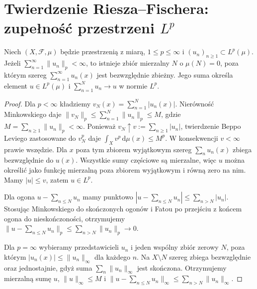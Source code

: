 \section{Twierdzenie Riesza--Fischera: zupełność przestrzeni $L^p$}

\begin{twierdzenie}
\label{thm:series-lp-14}
Niech $(X,\mathcal F,\mu)$ będzie przestrzenią z miarą,
$1\le p\le\infty$ i $(u_n)_{n\ge1}\subset L^p(\mu)$.
Jeżeli $\sum_{n=1}^\infty\|u_n\|_p<\infty$,
to istnieje zbiór mierzalny $N$ o $\mu(N)=0$,
poza którym szereg $\sum_{n=1}^\infty u_n(x)$
jest bezwzględnie zbieżny. Jego suma określa element $u\in L^p(\mu)$
i $\sum_{n=1}^N u_n\to u$ w normie $L^p$.
\end{twierdzenie}
\begin{proof}
Dla $p<\infty$ kładziemy $v_N(x)=\sum_{n=1}^N|u_n(x)|$.
Nierówność Minkowskiego daje
$\|v_N\|_p\le\sum_{n=1}^N\|u_n\|_p\le M$,
gdzie $M=\sum_{n\ge1}\|u_n\|_p<\infty$.
Ponieważ $v_N\uparrow v:=\sum_{n\ge1}|u_n|$,
twierdzenie Beppo Leviego zastosowane do $v_N^p$ daje
$\int_Xv^p\,\mathrm d\mu(x)\le M^p$.
W konsekwencji $v<\infty$ prawie wszędzie.
Dla $x$ poza tym zbiorem wyjątkowym szereg
$\sum_nu_n(x)$ zbiega bezwzględnie do $u(x)$.
Wszystkie sumy częściowe są mierzalne, więc $u$
można określić jako funkcję mierzalną poza zbiorem
wyjątkowym i równą zero na nim. Mamy $|u|\le v$,
zatem $u\in L^p$.

Dla ogona $u-\sum_{n\le N}u_n$ mamy punktowo
$|u-\sum_{n\le N}u_n|\le\sum_{n>N}|u_n|$.
Stosując Minkowskiego do skończonych ogonów
i Fatou po przejściu z końcem ogona do nieskończoności,
otrzymujemy
$\|u-\sum_{n\le N}u_n\|_p\le\sum_{n>N}\|u_n\|_p\to0$.

Dla $p=\infty$ wybieramy przedstawicieli $u_n$
i jeden wspólny zbiór zerowy $N$, poza którym
$|u_n(x)|\le\|u_n\|_\infty$ dla każdego $n$.
Na $X\setminus N$ szereg zbiega bezwzględnie
oraz jednostajnie, gdyż suma $\sum_n\|u_n\|_\infty$
jest skończona. Otrzymujemy mierzalną sumę $u$,
$\|u\|_\infty\le M$ i
$\|u-\sum_{n\le N}u_n\|_\infty\le\sum_{n>N}\|u_n\|_\infty$.
\end{proof}

